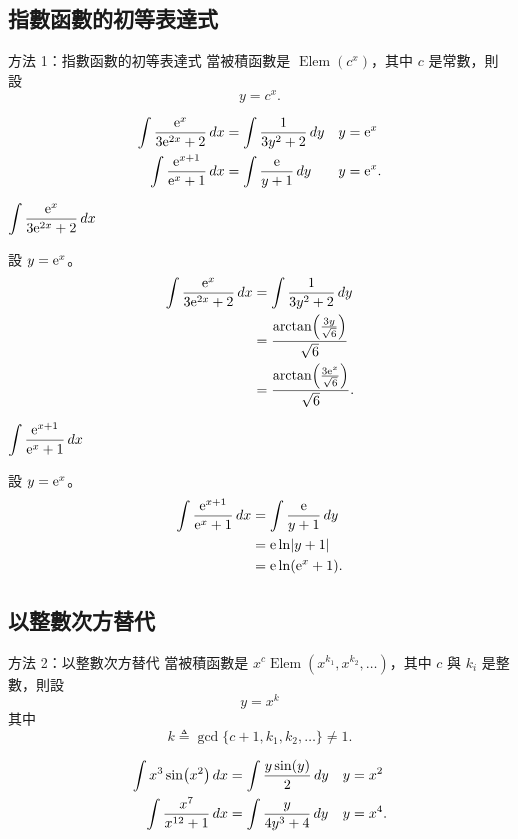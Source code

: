 \documentclass{beamer}
\newcommand{\Left} {\mathopen{}\mathclose\bgroup\left}
\newcommand{\Right}{\aftergroup\egroup\right}
\newcommand{\e}{\textup e}
\newcommand{\Elem}{\operatorname{Elem}}
\theoremstyle{remark}
\begin{document}
\begin{CJK}{UTF8}{bsmi}
\subsection[指數替代]{指數函數的初等表達式}
\begin{frame}{方法 1：指數函數的初等表達式}
  當被積函數是 $\Elem(c^x)$，其中 $c$ 是常數，則設
  \[y = c^x.\]
  \begin{example}
    \begin{align*}
      \int \frac{\e^x}{3\e^{2x} + 2}\,dx &= \int \frac{1}{3y^2 + 2}\,dy & y = \e^x\phantom.\\
      \int \frac{\e^{x+1}}{\e^x + 1}\,dx &= \int \frac{\e}{y + 1}\,dy   & y = \e^x.
    \end{align*}
  \end{example}
\end{frame}

\begin{frame}{$\displaystyle \int \frac{\e^x}{3\e^{2x} + 2}\,dx$}
  \begin{solution}
    設 $y = \e^x$。
    \begin{align*}
      \int \frac{\e^x}{3\e^{2x} + 2}\,dx &= \int \frac{1}{3y^2 + 2}\,dy\\
	&= \frac{\arctan \Left( \frac{3y}{\sqrt6} \Right)}{\sqrt6}\\
	&= \frac{\arctan \Left( \frac{3\e^x}{\sqrt6} \Right)}{\sqrt6}.
    \end{align*}
  \end{solution}
\end{frame}

\begin{frame}{$\displaystyle \int \frac{\e^{x+1}}{\e^x + 1}\,dx$}
  \begin{solution}
    設 $y = \e^x$。
    \begin{align*}
      \int \frac{\e^{x+1}}{\e^x + 1}\,dx &= \int \frac{\e}{y + 1}\,dy\\
	&= \e \ln \Left| y+1 \Right|\\
	&= \e \ln \Left( \e^x + 1 \Right).
    \end{align*}
  \end{solution}
\end{frame}

\subsection[冪替代]{以整數次方替代}
\begin{frame}{方法 2：以整數次方替代}
  當被積函數是 $x^c \Elem(x^{k_1}, x^{k_2}, \dots)$，其中 $c$ 與 $k_i$ 是整數，則設
  \[y = x^k\]
  其中
  \[k \triangleq \gcd\{c+1, k_1, k_2, \dots\} \ne 1.\]
  \begin{example}
    \begin{align*}
      \int x^3 \sin \Left( x^2 \Right)\,dx &= \int \frac{y \sin(y)}{2}\,dy & y = x^2\phantom.\\
      \int \frac{x^7}{x^{12} + 1}\,dx &= \int \frac{y}{4y^3 + 4}\,dy       & y = x^4.
    \end{align*}
  \end{example}
\end{frame}


\end{CJK}
\end{document}
